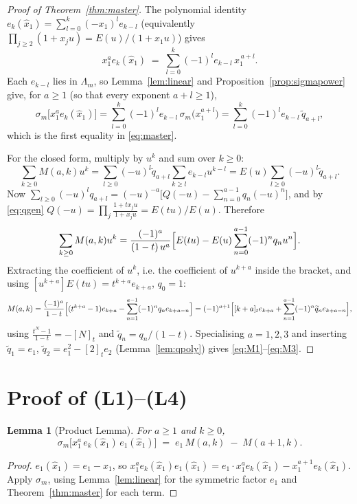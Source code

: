 \documentclass[11pt]{article}
\theoremstyle{plain}
\newtheorem{lemma}[theorem]{Lemma}
\theoremstyle{definition}
\newcommand{\qt}[1]{[#1]_t}
\newcommand{\hx}{\widehat{x}}
\newcommand{\Lm}{\Lambda_m}
\newcommand{\sm}{\sigma_m}
\newcommand{\qq}{\widetilde{q}}
\begin{document}
\begin{proof}[Proof of Theorem~\ref{thm:master}]
The polynomial identity
$e_k(\hx_1)=\sum_{l=0}^{k}(-x_1)^{l}e_{k-l}$
(equivalently $\prod_{j\ge2}(1+x_ju)=E(u)/(1+x_1u)$) gives
\[
  x_1^{a}e_k(\hx_1)\;=\;\sum_{l=0}^{k}(-1)^{l}e_{k-l}\,x_1^{\,a+l}.
\]
Each $e_{k-l}$ lies in $\Lm$, so Lemma~\ref{lem:linear} and Proposition~\ref{prop:sigmapower}
give, for $a\ge1$ (so that every exponent $a+l\ge1$),
\[
  \sm\bigl[x_1^{a}e_k(\hx_1)\bigr]=\sum_{l=0}^{k}(-1)^{l}e_{k-l}\,\sm\bigl(x_1^{a+l}\bigr)
   =\sum_{l=0}^{k}(-1)^{l}e_{k-l}\,\qq_{a+l},
\]
which is the first equality in \eqref{eq:master}.

For the closed form, multiply by $u^k$ and sum over $k\ge0$:
\[
  \sum_{k\ge0}M(a,k)u^{k}=\sum_{l\ge0}(-u)^{l}\qq_{a+l}\sum_{k\ge l}e_{k-l}u^{k-l}
  =E(u)\sum_{l\ge0}(-u)^{l}\qq_{a+l}.
\]
Now $\sum_{l\ge0}(-u)^{l}q_{a+l}=(-u)^{-a}\bigl[Q(-u)-\sum_{n=0}^{a-1}q_n(-u)^{n}\bigr]$, and by
\eqref{eq:qgen}
$Q(-u)=\prod_j\frac{1+tx_ju}{1+x_ju}=E(tu)/E(u)$. Therefore
\[
  \sum_{k\ge0}M(a,k)u^{k}
  =\frac{(-1)^{a}}{(1-t)\,u^{a}}\Bigl[E(tu)-E(u)\sum_{n=0}^{a-1}(-1)^{n}q_nu^{n}\Bigr].
\]
Extracting the coefficient of $u^{k}$, i.e. the coefficient of $u^{k+a}$ inside the bracket, and
using $[u^{k+a}]E(tu)=t^{k+a}e_{k+a}$, $q_0=1$:
\[
  M(a,k)=\frac{(-1)^{a}}{1-t}\Bigl[(t^{k+a}-1)e_{k+a}-\sum_{n=1}^{a-1}(-1)^{n}q_ne_{k+a-n}\Bigr]
  =(-1)^{a+1}\Bigl[\qt{k+a}e_{k+a}+\sum_{n=1}^{a-1}(-1)^{n}\qq_ne_{k+a-n}\Bigr],
\]
using $\frac{t^{N}-1}{1-t}=-\qt{N}$ and $\qq_n=q_n/(1-t)$. Specialising $a=1,2,3$ and inserting
$\qq_1=e_1$, $\qq_2=e_1^2-\qt2 e_2$ (Lemma~\ref{lem:qpoly}) gives
\eqref{eq:M1}--\eqref{eq:M3}.
\end{proof}

\section{Proof of (L1)--(L4)}

\begin{lemma}[Product Lemma]\label{lem:product}
For $a\ge1$ and $k\ge0$,
\[
  \sm\bigl[x_1^{a}\,e_k(\hx_1)\,e_1(\hx_1)\bigr]\;=\;e_1\,M(a,k)\;-\;M(a+1,k).
\]
\end{lemma}

\begin{proof}
$e_1(\hx_1)=e_1-x_1$, so
$x_1^{a}e_k(\hx_1)e_1(\hx_1)=e_1\cdot x_1^{a}e_k(\hx_1)-x_1^{a+1}e_k(\hx_1)$.
Apply $\sm$, using Lemma~\ref{lem:linear} for the symmetric factor $e_1$ and
Theorem~\ref{thm:master} for each term.
\end{proof}
\end{document}
